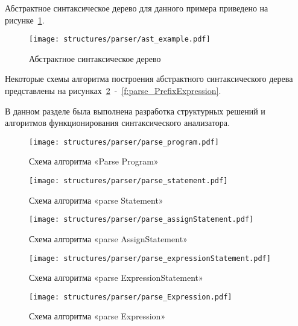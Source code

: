 Абстрактное синтаксическое дерево для данного примера приведено на рисунке~\ref{f:ast_example}.

\begin{figure}[ht]
	\centering
	\vspace{\toppaddingoffigure}
	\texttt{[image: structures/parser/ast\_example.pdf]}
	\caption{Абстрактное синтаксическое дерево}
	\label{f:ast_example}
\end{figure}

Некоторые схемы алгоритма построения абстрактного синтаксического дерева представлены на рисунках~\ref{f:parse_program}~-~\ref{f:parse_PrefixExpression}.

В данном разделе была выполнена разработка структурных решений и алгоритмов функционирования синтаксического анализатора.

\clearpage

\begin{figure}[!htp]
	\centering
	\texttt{[image: structures/parser/parse\_program.pdf]}
	\caption{Схема алгоритма «Parse Program»}
	\label{f:parse_program}
\end{figure}

\clearpage

\begin{figure}[!htp]
	\centering
	\texttt{[image: structures/parser/parse\_statement.pdf]}
	\caption{Схема алгоритма «parse Statement»}
	\label{f:parse_statement}
\end{figure}

\clearpage

\begin{figure}[ht]
	\centering
	\texttt{[image: structures/parser/parse\_assignStatement.pdf]}
	\caption{Схема алгоритма «parse AssignStatement»}
	\label{f:parse_assignStatement}
\end{figure}

\begin{figure}[!htp]
	\centering
	\texttt{[image: structures/parser/parse\_expressionStatement.pdf]}
	\caption{Схема алгоритма «parse ExpressionStatement»}
	\label{f:parse_expressionStatement}
\end{figure}

\begin{figure}[!htp]
	\centering
	\texttt{[image: structures/parser/parse\_Expression.pdf]}
	\caption{Схема алгоритма «parse Expression»}
	\label{f:parse_Expression}
\end{figure}

